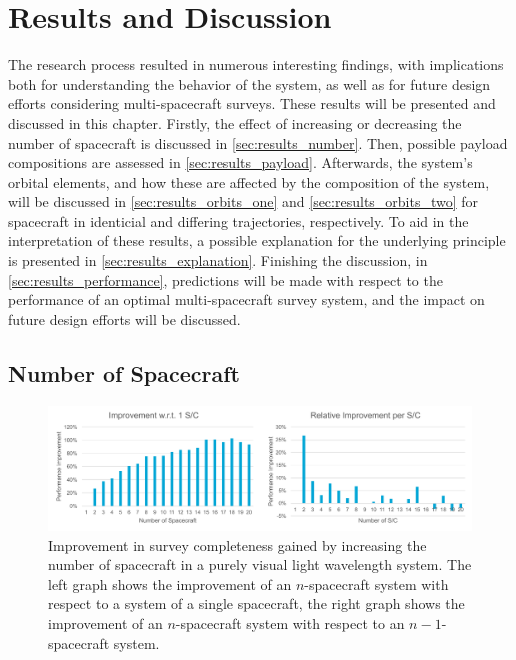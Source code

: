 \chapter{Results and Discussion}
\label{ch:results}
The research process resulted in numerous interesting findings, with implications both for understanding the behavior of the system, as well as for future design efforts considering multi-spacecraft surveys. These results will be presented and discussed in this chapter. Firstly, the effect of increasing or decreasing the number of spacecraft is discussed in \autoref{sec:results_number}. Then, possible payload compositions are assessed in \autoref{sec:results_payload}. Afterwards, the system's orbital elements, and how these are affected by the composition of the system, will be discussed in \autoref{sec:results_orbits_one} and \autoref{sec:results_orbits_two} for spacecraft in identicial and differing trajectories, respectively. To aid in the interpretation of these results, a possible explanation for the underlying principle is presented in \autoref{sec:results_explanation}. Finishing the discussion, in \autoref{sec:results_performance}, predictions will be made with respect to the performance of an optimal multi-spacecraft survey system, and the impact on future design efforts will be discussed.

\section{Number of Spacecraft}
\label{sec:results_number}

\begin{figure}[htbp]
 \centering
 \includegraphics[width=1.0\textwidth]{img/number_sc_vis.pdf}
 \caption{Improvement in survey completeness gained by increasing the number of spacecraft in a purely visual light wavelength system. The left graph shows the improvement of an $n$-spacecraft system with respect to a system of a single spacecraft, the right graph shows the improvement of an $n$-spacecraft system with respect to an $n-1$-spacecraft system.}
 \label{fig:results_number_vis}
\end{figure}



